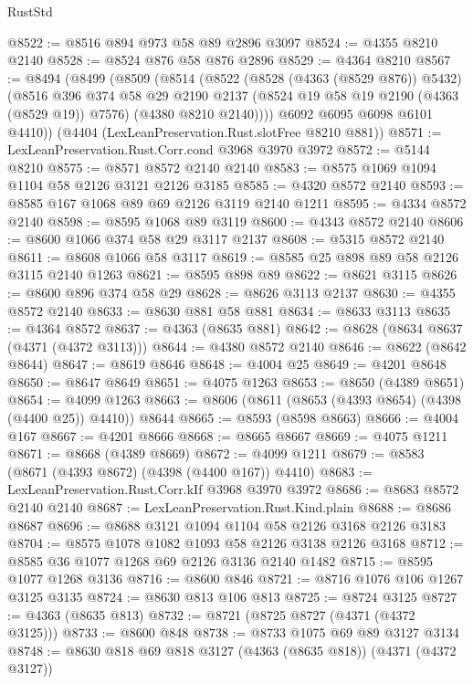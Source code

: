\begin{lexlean}{RustStd}
\begin{coremodule}
@8522 := @8516 @894 @973 @58 @89 @2896 @3097
@8524 := @4355 @8210 @2140
@8528 := @8524 @876 @58 @876 @2896
@8529 := @4364 @8210
@8567 := @8494
    (@8499
      (@8509
        (@8514
          (@8522
            (@8528 (@4363 (@8529 @876)) @5432)
            (@8516
              @396
              @374
              @58
              @29
              @2190
              @2137
              (@8524 @19 @58 @19 @2190 (@4363 (@8529 @19)) @7576)
              (@4380 @8210 @2140))))
        @6092
        @6095
        @6098
        @6101
        @4410))
    (@4404 (LexLeanPreservation.Rust.slotFree @8210 @881))
@8571 := LexLeanPreservation.Rust.Corr.cond @3968 @3970 @3972
@8572 := @5144 @8210
@8575 := @8571 @8572 @2140 @2140
@8583 := @8575 @1069 @1094 @1104 @58 @2126 @3121 @2126 @3185
@8585 := @4320 @8572 @2140
@8593 := @8585 @167 @1068 @89 @69 @2126 @3119 @2140 @1211
@8595 := @4334 @8572 @2140
@8598 := @8595 @1068 @89 @3119
@8600 := @4343 @8572 @2140
@8606 := @8600 @1066 @374 @58 @29 @3117 @2137
@8608 := @5315 @8572 @2140
@8611 := @8608 @1066 @58 @3117
@8619 := @8585 @25 @898 @89 @58 @2126 @3115 @2140 @1263
@8621 := @8595 @898 @89
@8622 := @8621 @3115
@8626 := @8600 @896 @374 @58 @29
@8628 := @8626 @3113 @2137
@8630 := @4355 @8572 @2140
@8633 := @8630 @881 @58 @881
@8634 := @8633 @3113
@8635 := @4364 @8572
@8637 := @4363 (@8635 @881)
@8642 := @8628 (@8634 @8637 (@4371 (@4372 @3113)))
@8644 := @4380 @8572 @2140
@8646 := @8622 (@8642 @8644)
@8647 := @8619 @8646
@8648 := @4004 @25
@8649 := @4201 @8648
@8650 := @8647 @8649
@8651 := @4075 @1263
@8653 := @8650 (@4389 @8651)
@8654 := @4099 @1263
@8663 := @8606 (@8611 (@8653 (@4393 @8654) (@4398 (@4400 @25)) @4410)) @8644
@8665 := @8593 (@8598 @8663)
@8666 := @4004 @167
@8667 := @4201 @8666
@8668 := @8665 @8667
@8669 := @4075 @1211
@8671 := @8668 (@4389 @8669)
@8672 := @4099 @1211
@8679 := @8583 (@8671 (@4393 @8672) (@4398 (@4400 @167)) @4410)
@8683 := LexLeanPreservation.Rust.Corr.kIf @3968 @3970 @3972
@8686 := @8683 @8572 @2140 @2140
@8687 := LexLeanPreservation.Rust.Kind.plain
@8688 := @8686 @8687
@8696 := @8688 @3121 @1094 @1104 @58 @2126 @3168 @2126 @3183
@8704 := @8575 @1078 @1082 @1093 @58 @2126 @3138 @2126 @3168
@8712 := @8585 @36 @1077 @1268 @69 @2126 @3136 @2140 @1482
@8715 := @8595 @1077 @1268 @3136
@8716 := @8600 @846
@8721 := @8716 @1076 @106 @1267 @3125 @3135
@8724 := @8630 @813 @106 @813
@8725 := @8724 @3125
@8727 := @4363 (@8635 @813)
@8732 := @8721 (@8725 @8727 (@4371 (@4372 @3125)))
@8733 := @8600 @848
@8738 := @8733 @1075 @69 @89 @3127 @3134
@8748 := @8630 @818 @69 @818 @3127 (@4363 (@8635 @818)) (@4371 (@4372 @3127))

\end{coremodule}
\end{lexlean}
